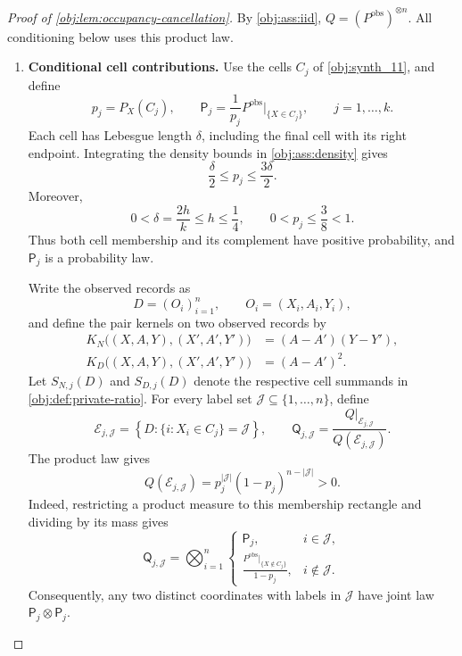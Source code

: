 \begin{proof}[Proof of \cref{obj:lem:occupancy-cancellation}]
By \cref{obj:ass:iid}, \(Q=(P^{\mathrm{obs}})^{\otimes n}\). All conditioning below uses this product law.

\begin{enumerate}
\item \textbf{Conditional cell contributions.}
Use the cells \(C_j\) of \cref{obj:synth_11}, and define
\[
p_j=P_X(C_j),\qquad
\mathsf P_j=\frac{1}{p_j}
 P^{\mathrm{obs}}\big|_{\{X\in C_j\}},
\qquad j=1,\ldots,k.
\]
Each cell has Lebesgue length \(\delta\), including the final cell with its right endpoint. Integrating the density bounds in \cref{obj:ass:density} gives
\[
\frac{\delta}{2}\le p_j\le\frac{3\delta}{2}.
\]
Moreover,
\[
0<\delta=\frac{2h}{k}\le h\le\frac14,
\qquad
0<p_j\le\frac38<1.
\]
Thus both cell membership and its complement have positive probability, and \(\mathsf P_j\) is a probability law.

Write the observed records as
\[
D=(O_i)_{i=1}^n,\qquad O_i=(X_i,A_i,Y_i),
\]
and define the pair kernels on two observed records by
\[
\begin{aligned}
K_N\bigl((X,A,Y),(X',A',Y')\bigr)
  &=(A-A')(Y-Y'),\\
K_D\bigl((X,A,Y),(X',A',Y')\bigr)
  &=(A-A')^2.
\end{aligned}
\]
Let \(S_{N,j}(D)\) and \(S_{D,j}(D)\) denote the respective cell summands in \cref{obj:def:private-ratio}. For every label set
\(\mathcal J\subseteq\{1,\ldots,n\}\), define
\[
\mathcal E_{j,\mathcal J}
=
\left\{D:\{i:X_i\in C_j\}=\mathcal J\right\},
\qquad
\mathsf Q_{j,\mathcal J}
=
\frac{Q|_{\mathcal E_{j,\mathcal J}}}
     {Q(\mathcal E_{j,\mathcal J})}.
\]
The product law gives
\[
Q(\mathcal E_{j,\mathcal J})
=p_j^{|\mathcal J|}(1-p_j)^{n-|\mathcal J|}>0.
\]
Indeed, restricting a product measure to this membership rectangle and dividing by its mass gives
\[
\mathsf Q_{j,\mathcal J}
=
\bigotimes_{i=1}^n
\begin{cases}
\mathsf P_j,&i\in\mathcal J,\\[2pt]
\displaystyle
\frac{P^{\mathrm{obs}}|_{\{X\notin C_j\}}}{1-p_j},
&i\notin\mathcal J.
\end{cases}
\]
Consequently, any two distinct coordinates with labels in \(\mathcal J\) have joint law
\(\mathsf P_j\otimes\mathsf P_j\).


\end{enumerate}
\end{proof}
